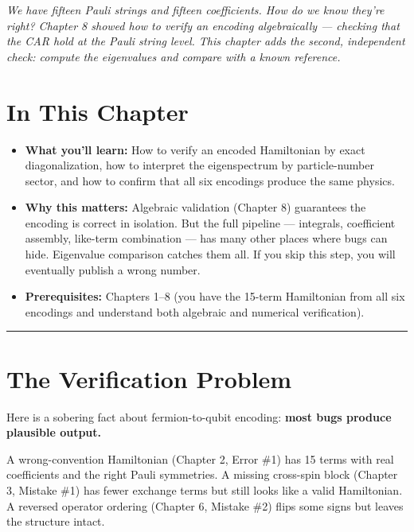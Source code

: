 \documentclass[
  11pt,
  oneside]{book}
\providecommand{\tightlist}{%
  \setlength{\itemsep}{0pt}\setlength{\parskip}{0pt}}
\begin{document}
\emph{We have fifteen Pauli strings and fifteen coefficients. How do we
know they're right? Chapter 8 showed how to verify an encoding
algebraically --- checking that the CAR hold at the Pauli string level.
This chapter adds the second, independent check: compute the eigenvalues
and compare with a known reference.}

\section{In This Chapter}\label{in-this-chapter-8}

\begin{itemize}
\tightlist
\item
  \textbf{What you'll learn:} How to verify an encoded Hamiltonian by
  exact diagonalization, how to interpret the eigenspectrum by
  particle-number sector, and how to confirm that all six encodings
  produce the same physics.
\item
  \textbf{Why this matters:} Algebraic validation (Chapter 8) guarantees
  the encoding is correct in isolation. But the full pipeline ---
  integrals, coefficient assembly, like-term combination --- has many
  other places where bugs can hide. Eigenvalue comparison catches them
  all. If you skip this step, you will eventually publish a wrong
  number.
\item
  \textbf{Prerequisites:} Chapters 1--8 (you have the 15-term
  Hamiltonian from all six encodings and understand both algebraic and
  numerical verification).
\end{itemize}

\begin{center}\rule{0.5\linewidth}{0.5pt}\end{center}

\section{The Verification Problem}\label{the-verification-problem}

Here is a sobering fact about fermion-to-qubit encoding: \textbf{most
bugs produce plausible output.}

A wrong-convention Hamiltonian (Chapter 2, Error \#1) has 15 terms with
real coefficients and the right Pauli symmetries. A missing cross-spin
block (Chapter 3, Mistake \#1) has fewer exchange terms but still looks
like a valid Hamiltonian. A reversed operator ordering (Chapter 6,
Mistake \#2) flips some signs but leaves the structure intact.
\end{document}
